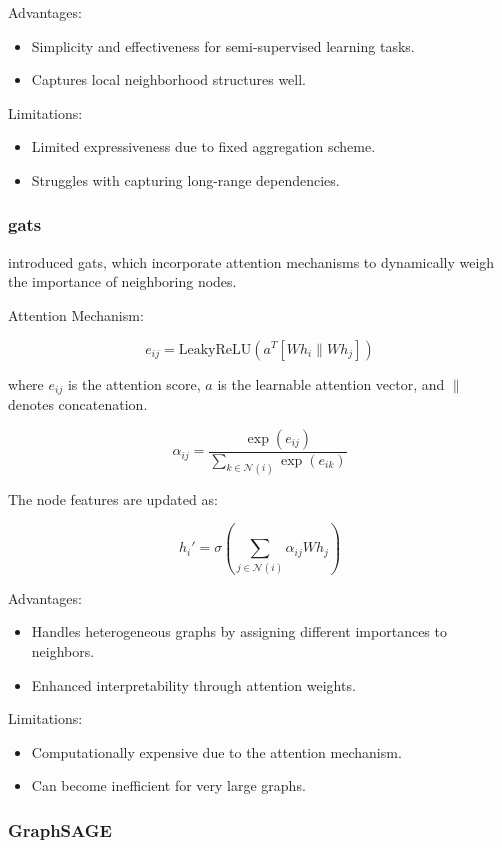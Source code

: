 Advantages:
\begin{itemize}
    \item Simplicity and effectiveness for semi-supervised learning tasks.
    \item Captures local neighborhood structures well.
\end{itemize}


Limitations:
\begin{itemize}
    \item Limited expressiveness due to fixed aggregation scheme.
    \item Struggles with capturing long-range dependencies.
\end{itemize}

\subsubsection*{\glspl{gat}}

\cite{Velickovic2018} introduced \glspl{gat}, which incorporate attention mechanisms to dynamically weigh the importance of neighboring nodes.

Attention Mechanism:

\[ e_{ij} = \text{LeakyReLU}\left(a^T [W h_i \| W h_j]\right) \]

where \( e_{ij} \) is the attention score, \( a \) is the learnable attention vector, and \( \| \) denotes concatenation.

\[ \alpha_{ij} = \frac{\exp(e_{ij})}{\sum_{k \in \mathcal{N}(i)} \exp(e_{ik})} \]

The node features are updated as:

\[ h_i' = \sigma\left(\sum_{j \in \mathcal{N}(i)} \alpha_{ij} W h_j\right) \]

Advantages:
\begin{itemize}
    \item Handles heterogeneous graphs by assigning different importances to neighbors.
    \item Enhanced interpretability through attention weights.
\end{itemize}


Limitations:
\begin{itemize}
    \item Computationally expensive due to the attention mechanism.
    \item Can become inefficient for very large graphs.
\end{itemize}

\subsubsection*{GraphSAGE}

